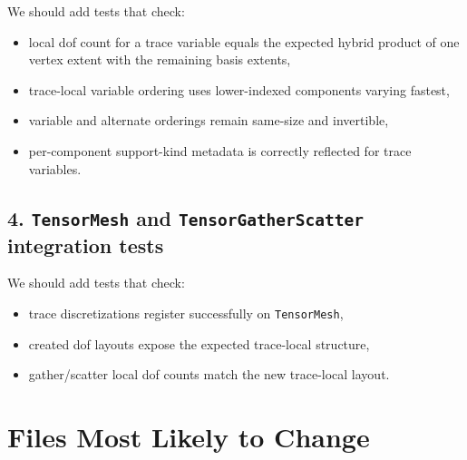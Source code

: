 \documentclass[11pt]{article}
\begin{document}
We should add tests that check:
\begin{itemize}[leftmargin=2em]
  \item local dof count for a trace variable equals the expected hybrid product of one vertex extent with the remaining basis extents,
  \item trace-local variable ordering uses lower-indexed components varying fastest,
  \item variable and alternate orderings remain same-size and invertible,
  \item per-component support-kind metadata is correctly reflected for trace variables.
\end{itemize}

\subsection{4. \texttt{TensorMesh} and \texttt{TensorGatherScatter} integration tests}

We should add tests that check:
\begin{itemize}[leftmargin=2em]
  \item trace discretizations register successfully on \texttt{TensorMesh},
  \item created dof layouts expose the expected trace-local structure,
  \item gather/scatter local dof counts match the new trace-local layout.
\end{itemize}

\section{Files Most Likely to Change}
\end{document}
